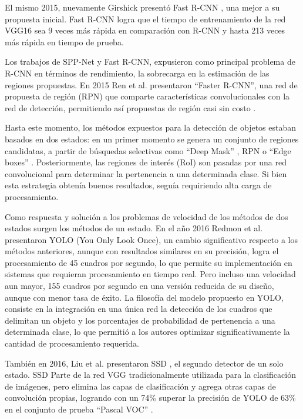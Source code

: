             El mismo 2015, nuevamente Girshick presentó Fast R-CNN \cite{Girshick2015}, una mejor a su propuesta inicial. Fast R-CNN logra que el tiempo de entrenamiento de la red VGG16\cite{Simonyan2014VGG} sea 9 veces más rápida en comparación con R-CNN y hasta 213 veces más rápida en tiempo de prueba.
            
            Los trabajos de SPP-Net y Fast R-CNN, expusieron como principal problema de R-CNN en términos de rendimiento, la sobrecarga en la estimación de las regiones propuestas. En 2015 Ren et al. presentaron ``Faster R-CNN'', una red de propuesta de región (RPN) que comparte características convolucionales con la red de detección, permitiendo así propuestas de región casi sin costo \cite{Ren2015}.
            
            Hasta este momento, los métodos expuestos para la detección de objetos estaban basados en dos estados: en un primer momento se genera un conjunto de regiones candidatas, a partir de búsquedas selectivas como ``Deep Mask'' \cite{Pinheiro2015}, RPN \cite{Ren2015} o ``Edge boxes'' \cite{Zitnick2014}. Posteriormente, las regiones de interés (RoI) son pasadas por una red convolucional para determinar la pertenencia a una determinada clase. Si bien esta estrategia obtenía buenos resultados, seguía requiriendo alta carga de procesamiento. 
            
            Como respuesta y solución a los problemas de velocidad de los métodos de dos estados surgen los métodos de un estado. En el año 2016 Redmon et al. presentaron YOLO \cite{Redmon2016} (You Only Look Once), un cambio significativo respecto a los métodos anteriores, aunque con resultados similares en su precisión, logra el procesamiento de 45 cuadros por segundo, lo que permite su implementación en sistemas que requieran procesamiento en tiempo real. Pero incluso una velocidad aun mayor, 155 cuadros por segundo en una versión reducida de su diseño, aunque con menor tasa de éxito. La filosofía del modelo propuesto en YOLO, consiste en la integración en una única red la detección de los cuadros que delimitan un objeto y los porcentajes de probabilidad de pertenencia a una determinada clase, lo que permitió a los autores optimizar significativamente la cantidad de procesamiento requerida.
            
            También en 2016, Liu et al. presentaron SSD \cite{Liu2016}, el segundo detector de un solo estado. SSD Parte de la red VGG\cite{Simonyan2014VGG} tradicionalmente utilizada para la clasificación de imágenes, pero elimina las capas de clasificación y agrega otras capas de convolución propias, logrando con un 74\% superar la precisión de YOLO de 63\% en el conjunto de prueba ``Pascal VOC'' \cite{VOC2010}.
            
